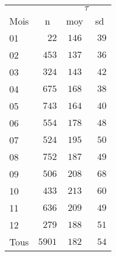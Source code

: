 \begin{tabular}{lccc}
\toprule
 &  & \multicolumn{2}{c}{$\tau$} \\ \cmidrule(lr){3-4}
Mois  & n & moy & \multicolumn{1}{c}{sd} \\ 
\midrule
01  & $\phantom{00}22$ & $146$ & $\phantom{0}39$ \\
02  & $\phantom{0}453$ & $137$ & $\phantom{0}36$ \\
03  & $\phantom{0}324$ & $143$ & $\phantom{0}42$ \\
04  & $\phantom{0}675$ & $168$ & $\phantom{0}38$ \\
05  & $\phantom{0}743$ & $164$ & $\phantom{0}40$ \\
06  & $\phantom{0}554$ & $178$ & $\phantom{0}48$ \\
07  & $\phantom{0}524$ & $195$ & $\phantom{0}50$ \\
08  & $\phantom{0}752$ & $187$ & $\phantom{0}49$ \\
09  & $\phantom{0}506$ & $208$ & $\phantom{0}68$ \\
10  & $\phantom{0}433$ & $213$ & $\phantom{0}60$ \\
11  & $\phantom{0}636$ & $209$ & $\phantom{0}49$ \\
12  & $\phantom{0}279$ & $188$ & $\phantom{0}51$ \\
Tous  & $5901$ & $182$ & $\phantom{0}54$ \\
\bottomrule 
\end{tabular}
